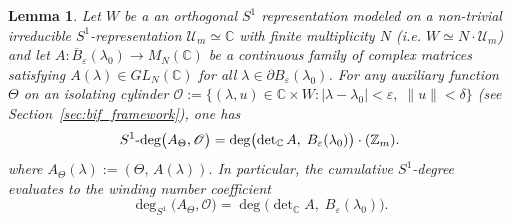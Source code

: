 \documentclass[twoside,11pt]{article}
\def\bc{{\mathbb{C}}}
\def\bz{{\mathbb{Z}}}
\def\s1deg{S^1\text{\rm -deg}}
\newtheorem{lemma}[theorem]{Lemma}
\begin{document}
\begin{lemma} \rm \label{lemm:determinantal_reduction}
Let $W$ be a an orthogonal $S^1$
representation modeled on a non-trivial irreducible $S^1$-representation $\mathcal U_m \simeq \bc$ with finite multiplicity $N$ (i.e. $W \simeq N \cdot \mathcal U_m$) and let $A\colon \overline{B}_\varepsilon(\lambda_0) \to M_N(\bc)$ be a continuous family of complex matrices satisfying $A(\lambda) \in GL_N(\bc)$ for all $\lambda \in \partial B_\varepsilon(\lambda_0)$. For any auxiliary function $\Theta$  on an isolating cylinder $\mathscr O := \{(\lambda,u) \in \bc \times W : |\lambda - \lambda_0| < \varepsilon,\; \|u\| < \delta\}$ (see Section~\ref{sec:bif_framework}), one has
\begin{equation}\label{eq:det_reduction}
\s1deg\bigl(A_\Theta, \mathscr O \bigr)
= \deg\bigl(\det\nolimits_\bc A,\; B_\varepsilon(\lambda_0)\bigr)
  \cdot (\bz_m).
\end{equation}
where $A_\Theta(\lambda) := (\Theta,\, A(\lambda))$. In particular, the cumulative $S^1$-degree evaluates to the winding number coefficient
\[
\deg_{S^1}\bigl(A_\Theta, \mathscr O \bigr)
= \deg\bigl(\det\nolimits_\bc A,\; B_\varepsilon(\lambda_0)\bigr).
\]
\end{lemma}
\end{document}

